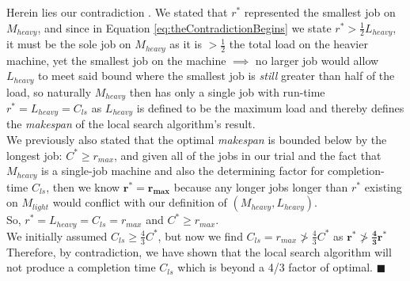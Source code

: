 \documentclass[conference]{styles/acmsiggraph}
\newcommand{\?}{\stackrel{?}{=}}
\renewcommand\qedsymbol{$\blacksquare$}
\DeclareRobustCommand{\mybox}[2][gray!20]{%
\begin{tcolorbox}[   %
        breakable,
        left=0pt,
        right=0pt,
        top=0pt,
        bottom=0pt,
        colback=#1,
        colframe=#1,
        width=\dimexpr\textwidth\relax, 
        enlarge left by=0mm,
        boxsep=5pt,
        arc=0pt,outer arc=0pt,
        ]
        #2
\end{tcolorbox}
}
\begin{document}
\mybox{
Herein lies our contradiction .  We stated that $r^*$ represented the smallest job on $M_{heavy}$, and since in Equation \ref{eq:theContradictionBegins} we state $r^* > \frac{1}{2} L_{heavy}$, it must be the sole job on $M_{heavy}$ as it is $> \frac{1}{2}$ the total load on the heavier machine, yet the smallest job on the machine $\implies$ no larger job would allow $L_{heavy}$ to meet said bound where the smallest job is \textit{still} greater than half of the load, so naturally $M_{heavy}$ then has only a single job with run-time $r^* = L_{heavy} = C_{ls}$ as $L_{heavy}$ is defined to be the maximum load and thereby defines the \textit{makespan} of the local search algorithm's result.\\

We previously also stated that the optimal \textit{makespan} is bounded below by the longest job: $C^* \geq r_{max}$, and given all of the jobs in our trial and the fact that $M_{heavy}$ is a single-job machine and also the determining factor for completion-time $C_{ls}$, then we know $\mathbf{r^* = r_{max}}$ because any longer jobs longer than $r^*$ existing on $M_{light}$ would conflict with our definition of $(M_{heavy}, L_{heavy})$.\\

So, $r^* = L_{heavy} = C_{ls} = r_{max}$ and $C^* \geq r_{max}$.\\

We initially assumed $C_{ls} \geq \frac{4}{3}C^*$, but now we find $C_{ls} = r_{max} \not> \frac{4}{3}C^*$ as $\boxed{\mathbf{r^* \not> \frac{4}{3} r^*}}$\\

Therefore, by contradiction, we have shown that the local search algorithm will not produce a completion time $C_{ls}$ which is beyond a 4/3 factor of optimal. \qedsymbol
}
\end{document}
